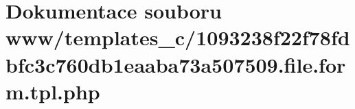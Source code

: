 \section{Dokumentace souboru www/templates\_\-c/1093238f22f78fdbfc3c760db1eaaba73a507509.file.form.tpl.php}
\label{d3/d43/1093238f22f78fdbfc3c760db1eaaba73a507509_8file_8form_8tpl_8php}
